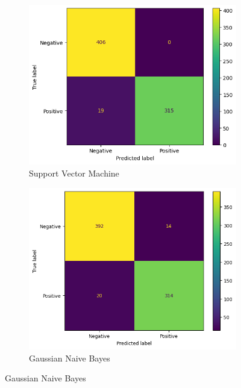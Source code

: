 \begin{figure}[!ht]
    \centering
    \begin{subfigure}{0.45\textwidth}
        \centering
        \includegraphics[width=\textwidth]{img/svm/matrice_confusione_pca.png}
        \caption{Support Vector Machine}
        \label{fig:matrice_di_confusione_per_SVM_pca}
    \end{subfigure}
    \hfill
    \begin{subfigure}{.45\textwidth}
        \centering
        \includegraphics[width=\textwidth]{img/gnb/confusion_matrix_pca.png}
        \caption{Gaussian Naive Bayes}
        \label{fig:matrice_di_confusione_per_GNB_pca}

\end{subfigure}
\end{figure}
